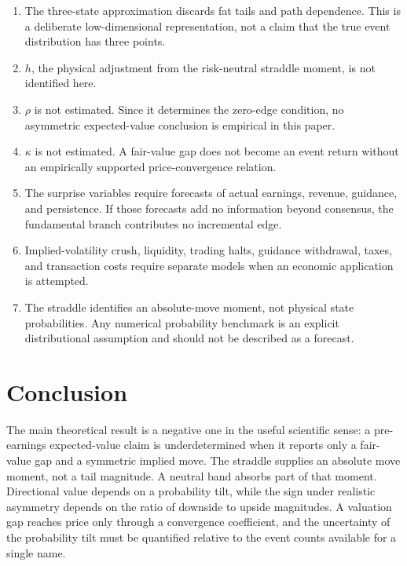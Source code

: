 \begin{enumerate}
\item The three-state approximation discards fat tails and path dependence.
      This is a deliberate low-dimensional representation, not a claim that
      the true event distribution has three points.
\item $h$, the physical adjustment from the risk-neutral straddle moment, is
      not identified here.
\item $\rho$ is not estimated. Since it determines the zero-edge condition, no
      asymmetric expected-value conclusion is empirical in this paper.
\item $\kappa$ is not estimated. A fair-value gap does not become an event
      return without an empirically supported price-convergence relation.
\item The surprise variables require forecasts of actual earnings, revenue,
      guidance, and persistence. If those forecasts add no information beyond
      consensus, the fundamental branch contributes no incremental edge.
\item Implied-volatility crush, liquidity, trading halts, guidance withdrawal,
      taxes, and transaction costs require separate models when an economic
      application is attempted.
\item The straddle identifies an absolute-move moment, not physical state
      probabilities. Any numerical probability benchmark is an explicit
      distributional assumption and should not be described as a forecast.
\end{enumerate}

\section{Conclusion}

The main theoretical result is a negative one in the useful scientific sense:
a pre-earnings expected-value claim is underdetermined when it reports only a
fair-value gap and a symmetric implied move. The straddle supplies an absolute
move moment, not a tail magnitude. A neutral band absorbs part of that moment.
Directional value depends on a probability tilt, while the sign under realistic
asymmetry depends on the ratio of downside to upside magnitudes. A valuation gap
reaches price only through a convergence coefficient, and the uncertainty of the
probability tilt must be quantified relative to the event counts available for a
single name.

